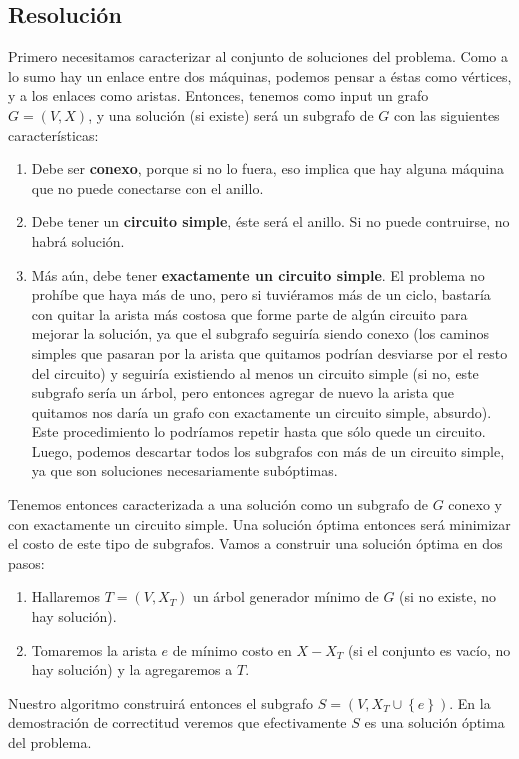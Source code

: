 \subsection{Resolución}

Primero necesitamos caracterizar al conjunto de soluciones del problema. Como a lo sumo hay un enlace entre dos máquinas, podemos pensar a éstas como vértices, y a los enlaces como aristas. Entonces, tenemos como input un grafo $G = (V,X)$, y una solución (si existe) será un subgrafo de $G$ con las siguientes características:
\begin{enumerate}
    \item Debe ser \textbf{conexo}, porque si no lo fuera, eso implica que hay alguna máquina que no puede conectarse con el anillo.
    \item Debe tener un \textbf{circuito simple}, éste será el anillo. Si no puede contruirse, no habrá solución.
    \item Más aún, debe tener \textbf{exactamente un circuito simple}. El problema no prohíbe que haya más de uno, pero si tuviéramos más de un ciclo, bastaría con quitar la arista más costosa que forme parte de algún circuito para mejorar la solución, ya que el subgrafo seguiría siendo conexo (los caminos simples que pasaran por la arista que quitamos podrían desviarse por el resto del circuito) y seguiría existiendo al menos un circuito simple (si no, este subgrafo sería un árbol, pero entonces agregar de nuevo la arista que quitamos nos daría un grafo con exactamente un circuito simple, absurdo). Este procedimiento lo podríamos repetir hasta que sólo quede un circuito. Luego, podemos descartar todos los subgrafos con más de un circuito simple, ya que son soluciones necesariamente subóptimas.
\end{enumerate}
Tenemos entonces caracterizada a una solución como un subgrafo de $G$ conexo y con exactamente un circuito simple. Una solución óptima entonces será minimizar el costo de este tipo de subgrafos. Vamos a construir una solución óptima en dos pasos:
\begin{enumerate}
 \item Hallaremos $T = (V, X_T)$ un árbol generador mínimo de $G$ (si no existe, no hay solución).
 \item Tomaremos la arista $e$ de mínimo costo en $X - X_T$ (si el conjunto es vacío, no hay solución) y la agregaremos a $T$.
\end{enumerate}
Nuestro algoritmo construirá entonces el subgrafo $S = (V, X_T \cup \left\{e\right\})$. En la demostración de correctitud veremos que efectivamente $S$ es una solución óptima del problema.

